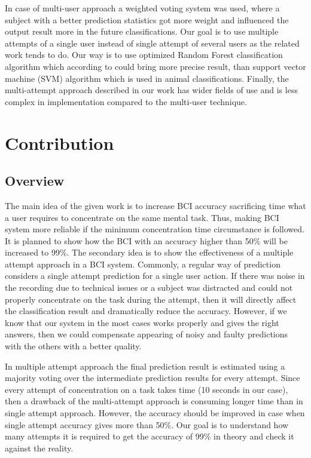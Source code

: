 \documentclass[12pt]{article}
\theoremstyle{definition}
\begin{document}
In case of multi-user approach a weighted voting system was used, where a subject with a better prediction statistics got more weight and influenced the output result more in the future classifications. Our goal is to use multiple attempts of a single user instead of single attempt of several users as the related work tends to do. Our way is to use optimized Random Forest classification algorithm which according to \cite{masso} could bring more precise result, than support vector machine (SVM) algorithm which is used in animal classifications. Finally, the multi-attempt approach described in our work has wider fields of use and is less complex in implementation compared to the multi-user technique.

\newpage
\section{Contribution}

\subsection{Overview}
The main idea of the given work is to increase BCI accuracy sacrificing time what a user requires to concentrate on the same mental task. Thus, making BCI system more reliable if the minimum concentration time circumstance is followed. It is planned to show how the BCI with an accuracy higher than 50\% will be increased to 99\%.
The secondary idea is to show the effectiveness of a multiple attempt approach in a BCI system. 
Commonly, a regular way of prediction considers a single attempt prediction for a single user action. If there was noise in the recording due to technical issues or a subject was distracted and could not properly concentrate on the task during the attempt, then it will directly affect the classification result and dramatically reduce the accuracy. However, if we know that our system in the most cases works properly and gives the right answers, then we could compensate appearing of noisy and faulty predictions with the others with a better quality.

In multiple attempt approach the final prediction result is estimated using a majority voting over the intermediate prediction results for every attempt. Since every attempt of concentration on a task takes time (10 seconds in our case), then a drawback of the multi-attempt approach is consuming longer time than in single attempt approach. However, the accuracy should be improved in case when single attempt accuracy gives more than 50\%. Our goal is to understand how many attempts it is required to get the accuracy of 99\% in theory and check it against the reality.
\end{document}
